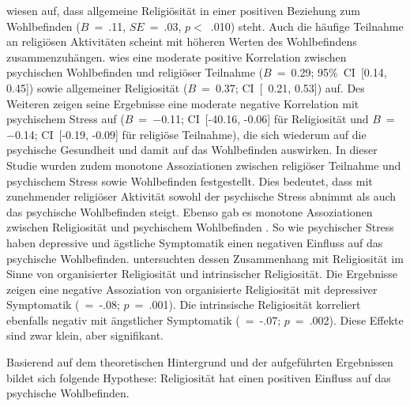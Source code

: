 \textcite{VanCapellen2016} wiesen auf, dass allgemeine Religiösität in einer positiven Beziehung zum Wohlbefinden ($B$~=~.11, $SE$~=~.03, $p<$~.010) steht. Auch die häufige Teilnahme an religiösen Aktivitäten scheint mit höheren Werten des Wohlbefindens zusammenzuhängen. \textcite{Jokela2022} wies eine moderate positive Korrelation zwischen psychischen Wohlbefinden und religiöser Teilnahme ($B$~=~0.29; 95\%~CI~[0.14, 0.45]) sowie allgemeiner Religiosität ($B$~=~0.37; CI~[~0.21, 0.53]) auf. Des Weiteren zeigen seine Ergebnisse eine moderate negative Korrelation mit psychischem Stress auf ($B$~=~$-$0.11; CI~[-40.16, -0.06] für Religiosität und $B$~=~$-$0.14; CI~[-0.19, -0.09] für religiöse Teilnahme), die sich wiederum auf die psychische Gesundheit und damit auf das Wohlbefinden auswirken. In dieser Studie wurden zudem monotone Assoziationen zwischen religiöser Teilnahme und psychischem Stress sowie Wohlbefinden festgestellt. Dies bedeutet, dass mit zunehmender religiöser Aktivität sowohl der psychische Stress abnimmt als auch das psychische Wohlbefinden steigt. Ebenso gab es monotone Assoziationen zwischen Religiosität und psychischem Wohlbefinden \parencite{Jokela2022}. So wie psychischer Stress haben depressive und ägstliche Symptomatik einen negativen Einfluss auf das psychische Wohlbefinden. \textcite{FernándezRosell2022} untersuchten dessen Zusammenhang mit Religiosität im Sinne von organisierter Religiosität und intrinsischer Religiosität. Die Ergebnisse zeigen eine negative Assoziation von organisierte Religiosität  mit depressiver Symptomatik (\textbeta~=~-.08; $p$~=~.001). Die intrinsische Religiosität korreliert ebenfalls negativ mit ängstlicher Symptomatik (\textbeta~=~-.07; $p$~=~.002). Diese Effekte sind zwar klein, aber signifikant.  

Basierend auf dem theoretischen Hintergrund und der aufgeführten Ergebnissen bildet sich folgende Hypothese: Religiosität hat einen positiven Einfluss auf das psychische Wohlbefinden.







